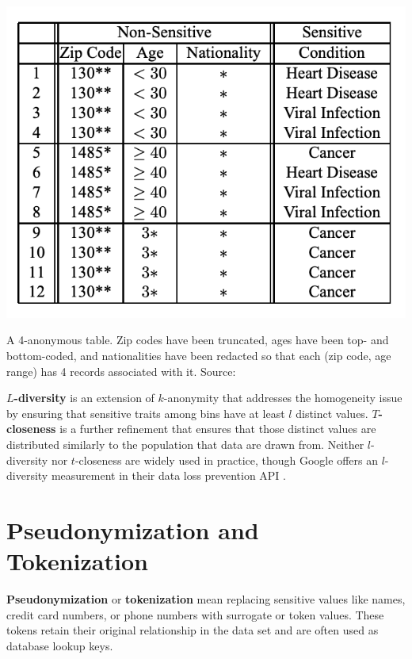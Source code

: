 \documentclass[nobib]{tufte-handout}
\begin{document}
\begin{marginfigure} \includegraphics[width=\linewidth]{kanon}
\caption{A 4-anonymous table. Zip codes have been truncated, ages have been
top- and bottom-coded, and nationalities have been redacted so that each
(zip code, age range) has 4 records associated with it. Source:
\cite{DBLP:conf/icde/MachanavajjhalaGKV06}}
\label{fig:kanon} \end{marginfigure}

\textbf{$L$-diversity} \cite{DBLP:conf/icde/MachanavajjhalaGKV06} is an extension
of $k$-anonymity that addresses the homogeneity issue by ensuring that sensitive
traits among bins have at least $l$ distinct values. \textbf{$T$-closeness}
\cite{DBLP:conf/icde/LiLV07} is a further refinement that ensures that those
distinct values are distributed similarly to the population that data are drawn
from. Neither $l$-diversity nor $t$-closeness are widely used in practice,
though Google offers an $l$-diversity measurement in their data loss prevention
API \cite{google-risk-analysis}.

\section{Pseudonymization and Tokenization}

\textbf{Pseudonymization} or \textbf{tokenization} mean replacing sensitive
values like names, credit card numbers, or phone numbers with surrogate or token
values. These tokens retain their original relationship in the data set and are
often used as database lookup keys.
\end{document}
